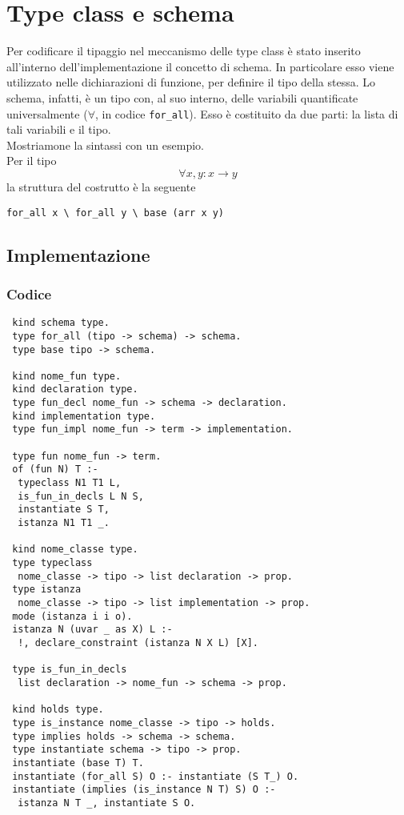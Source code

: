 \documentclass[12pt,a4paper,openright,twoside]{report}
\begin{document}
\section{Type class e schema}
Per codificare il tipaggio nel meccanismo delle type class è stato inserito all'interno dell'implementazione il concetto di schema. In particolare esso viene utilizzato nelle dichiarazioni di funzione, per definire il tipo della stessa. Lo schema, infatti, è un tipo con, al suo interno, delle variabili quantificate universalmente ($\forall$, in codice \verb"for_all"). Esso è costituito da due parti: la lista di tali variabili e il tipo.\\
Mostriamone la sintassi con un esempio.\\
Per il tipo
\begin{equation}
 \forall x,y : x \rightarrow y \label{eq:fax->y}
\end{equation}
la struttura del costrutto è la seguente
\begin{center}
 \verb"for_all x \ for_all y \ base (arr x y)"
\end{center}

\subsection{Implementazione}

\subsubsection{Codice}
\begin{verbatim}
 kind schema type.
 type for_all (tipo -> schema) -> schema.
 type base tipo -> schema.
 
 kind nome_fun type.
 kind declaration type.
 type fun_decl nome_fun -> schema -> declaration.
 kind implementation type.
 type fun_impl nome_fun -> term -> implementation.
 
 type fun nome_fun -> term.
 of (fun N) T :-
  typeclass N1 T1 L,
  is_fun_in_decls L N S,
  instantiate S T,
  istanza N1 T1 _.
 
 kind nome_classe type.
 type typeclass
  nome_classe -> tipo -> list declaration -> prop.
 type istanza
  nome_classe -> tipo -> list implementation -> prop.
 mode (istanza i i o).
 istanza N (uvar _ as X) L :-
  !, declare_constraint (istanza N X L) [X].
 
 type is_fun_in_decls
  list declaration -> nome_fun -> schema -> prop.
 
 kind holds type.
 type is_instance nome_classe -> tipo -> holds.
 type implies holds -> schema -> schema.
 type instantiate schema -> tipo -> prop.
 instantiate (base T) T.
 instantiate (for_all S) O :- instantiate (S T_) O.
 instantiate (implies (is_instance N T) S) O :-
  istanza N T _, instantiate S O.
\end{verbatim}
\end{document}
